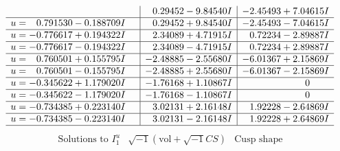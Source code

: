 \documentclass[1p]{elsarticle_modified}
\theoremstyle{definition}
\newcommand{\I}{\sqrt{-1}}
\begin{document}
$$\begin{array}{c|c|c}
 & \phantom{-}0.29452 - 9.84540 I & -2.45493 + 7.04615 I \\ \hline\begin{aligned}
u &= \phantom{-}0.791530 - 0.188709 I\end{aligned}
 & \phantom{-}0.29452 + 9.84540 I & -2.45493 - 7.04615 I \\ \hline\begin{aligned}
u &= -0.776617 + 0.194322 I\end{aligned}
 & \phantom{-}2.34089 + 4.71915 I & \phantom{-}0.72234 - 2.89887 I \\ \hline\begin{aligned}
u &= -0.776617 - 0.194322 I\end{aligned}
 & \phantom{-}2.34089 - 4.71915 I & \phantom{-}0.72234 + 2.89887 I \\ \hline\begin{aligned}
u &= \phantom{-}0.760501 + 0.155795 I\end{aligned}
 & -2.48885 - 2.55680 I & -6.01367 + 2.15869 I \\ \hline\begin{aligned}
u &= \phantom{-}0.760501 - 0.155795 I\end{aligned}
 & -2.48885 + 2.55680 I & -6.01367 - 2.15869 I \\ \hline\begin{aligned}
u &= -0.345622 + 1.179020 I\end{aligned}
 & -1.76168 + 1.10867 I & \phantom{-0.000000 } 0 \\ \hline\begin{aligned}
u &= -0.345622 - 1.179020 I\end{aligned}
 & -1.76168 - 1.10867 I & \phantom{-0.000000 } 0 \\ \hline\begin{aligned}
u &= -0.734385 + 0.223140 I\end{aligned}
 & \phantom{-}3.02131 + 2.16148 I & \phantom{-}1.92228 - 2.64869 I \\ \hline\begin{aligned}
u &= -0.734385 - 0.223140 I\end{aligned}
 & \phantom{-}3.02131 - 2.16148 I & \phantom{-}1.92228 + 2.64869 I\\
 \hline 
 \end{array}$$\newpage$$\begin{array}{c|c|c}  
\text{Solutions to }I^u_{1}& \I (\text{vol} + \sqrt{-1}CS) & \text{Cusp shape}\\
 \hline 
\begin{aligned}

\end{aligned}
\end{array}$$
\end{document}
